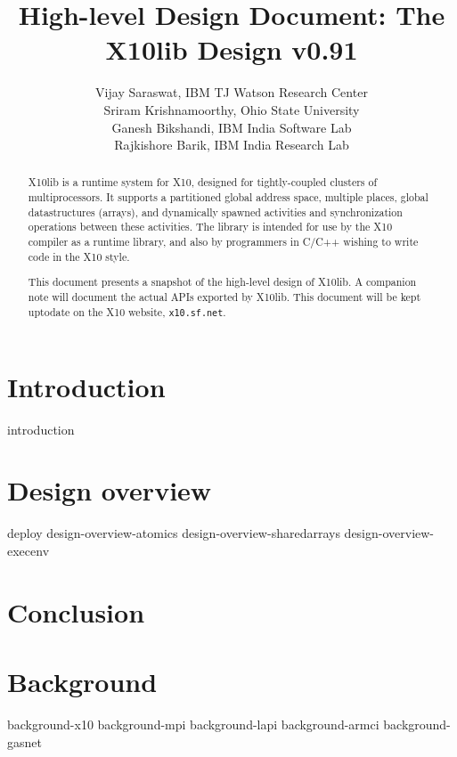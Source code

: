 \documentclass{article}
\def\Xten{{\sf X10}}
\def\Xtenlib{{\sf X10lib}}
\begin{document}
\title{High-level Design Document: The \Xtenlib{} Design v0.91}
\author{Vijay Saraswat, IBM TJ Watson Research Center \\
  Sriram Krishnamoorthy, Ohio State University \\
  Ganesh Bikshandi, IBM India Software Lab \\
  Rajkishore Barik, IBM India Research Lab}

\maketitle

\thispagestyle{fancy}


\begin{abstract}
{}\Xtenlib{} is a runtime system for \Xten{}, designed for
tightly-coupled clusters of multiprocessors. It supports a partitioned
global address space, multiple places, global datastructures (arrays),
and dynamically spawned activities and synchronization operations
between these activities. The library is intended for use by the
\Xten{} compiler as a runtime library, and also by programmers in
C/C++ wishing to write code in the \Xten{} style.

This document presents a snapshot of the high-level design of
\Xtenlib{}. A companion note will document the actual APIs exported by
\Xtenlib. This document will be kept uptodate on the \Xten{} website,
{\tt x10.sf.net}.
\end{abstract}

\section{Introduction}
 {introduction}


\section{Design overview}

 {deploy}
 {design-overview-atomics}
 {design-overview-sharedarrays}
 {design-overview-execenv}

\section{Conclusion}

%

%
\appendix
\section{Background}
 {background-x10}
 {background-mpi}
 {background-lapi}
 {background-armci}
 {background-gasnet}





\end{document}
